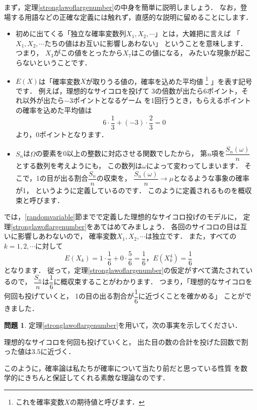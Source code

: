 \documentclass[./main]{subfiles} %
\theoremstyle{definition}
\newtheorem{hamadaqst}[hamadadefi]{問題}
\begin{document}
まず，定理\ref{stronglawoflargenumber}の中身を簡単に説明しましょう．
なお，登場する用語などの正確な定義には触れず，直感的な説明に留めることにします．
\begin{itemize}
\item 初めに出てくる「独立な確率変数列$X_1,X_2,\cdots$」とは，大雑把に言えば
「$X_1,X_2,\cdots$たちの値はお互いに影響しあわない」
ということを意味します．つまり，
$X_3$がこの値をとったから$X_7$はこの値になる，
みたいな現象が起こらないということです．
\item $E(X)$は「確率変数$X$が取りうる値の，確率を込めた平均値
\footnote{これを確率変数$X$の期待値と呼びます．}
」を表す記号です．
例えば，理想的なサイコロを投げて
3の倍数が出たら6ポイント，それ以外が出たら$-3$ポイントとなるゲーム
を1回行うとき，もらえるポイントの確率を込めた平均値は
\[ 6\cdot\frac{1}{3}+(-3)\cdot\frac{2}{3}=0 \]
より，0ポイントとなります．
\item $S_n$は$\Omega$の要素を0以上の整数に対応させる関数でしたから，
第$n$項を$\dfrac{S_n(\omega)}{n}$とする数列を考えようにも，
この数列は$\omega$によって変わってしまいます．
そこで，1の目が出る割合$\dfrac{S_n}{n}$の収束を，
$\dfrac{S_n(\omega)}{n}\to\mu$となるような事象の確率が1，
というように定義しているのです．
このように定義されるものを概収束と呼びます．
\end{itemize}

では，\ref{randomvariable}節までで定義した理想的なサイコロ投げのモデルに，
定理\ref{stronglawoflargenumber}をあてはめてみましょう．
各回のサイコロの目は互いに影響しあわないので，
確率変数$X_1,X_2,\cdots$は独立です．
また，すべての$k=1,2,\cdots$に対して
\[ E(X_k)=1\cdot\frac{1}{6}+0\cdot\frac{5}{6}=\frac{1}{6}，
E(X_k^4)=\frac{1}{6} \]
となります．
従って，定理\ref{stronglawoflargenumber}の仮定がすべて満たされているので，
$\dfrac{S_n}{n}$は$\dfrac{1}{6}$に概収束することがわかります．
つまり，「理想的なサイコロを何回も投げていくと，
1の目の出る割合が$\dfrac{1}{6}$に近づくことを確かめる」
ことができました．

\begin{hamadaqst}\label{test}
定理\ref{stronglawoflargenumber}を用いて，次の事実を示してください．
\begin{center}
理想的なサイコロを何回も投げていくと，
出た目の数の合計を投げた回数で割った値は$3.5$に近づく．
\end{center}
\end{hamadaqst}

このように，確率論は私たちが確率について当たり前だと思っている性質
を数学的にきちんと保証してくれる素敵な理論なのです．
\end{document}
